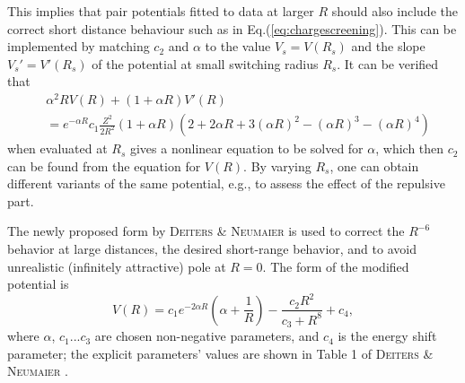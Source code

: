 \documentclass[12pt]{article}
\begin{document}
This implies that pair potentials fitted to data at larger $R$ should also include the correct short distance behaviour such as in Eq.(\ref{eq:chargescreening}). This can be implemented by matching $c_2$ and $\alpha$ to the value $V_s = V(R_s)$ and the slope $V_s' = V'(R_s)$ of the potential at small switching radius $R_s$. It can be verified that
\begin{equation}
    \begin{split}
        &\alpha^2RV(R) + (1 + \alpha R)V'(R) \\ & = 
        e^{-\alpha R} 
        c_1\frac{Z^2}{2R^2}(1+\alpha R)
        (2 + 2 \alpha R + 3(\alpha R)^2 - (\alpha R)^3 - (\alpha R)^4)
    \end{split}
\end{equation}
when evaluated at $R_s$ gives a nonlinear equation to be solved for $\alpha$, which then $c_2$ can be found from the equation for $V(R)$. By varying $R_s$, one can obtain different variants of the same potential, e.g., to assess the effect of the repulsive part.

The newly proposed form by \textsc{Deiters \& Neumaier} \cite{idx178} is used to correct the $R^{-6}$ behavior at large distances, the desired short-range behavior, and to avoid unrealistic (infinitely attractive) pole at $R=0$.
The form of the modified potential is
\begin{equation}
    V(R) = c_1 e^{-2\alpha R}\left(\alpha + \frac{1}{R}\right) - \frac{c_2R^2}{c_3 + R^8} + c_4,
    \label{eq:ljlike}
\end{equation}
where $\alpha$, $c_1$...$c_3$ are chosen non-negative parameters, and $c_4$ is the energy shift parameter; the explicit parameters' values are shown in Table 1 of \textsc{Deiters \& Neumaier} \cite{idx178}.
\end{document}

